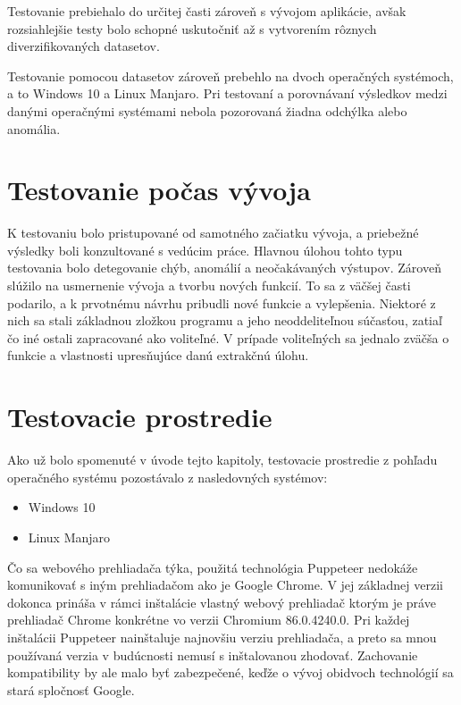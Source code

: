 Testovanie prebiehalo do určitej časti zároveň s vývojom aplikácie, avšak rozsiahlejšie testy bolo schopné uskutočniť až s vytvorením rôznych diverzifikovaných datasetov.

Testovanie pomocou datasetov zároveň prebehlo na dvoch operačných systémoch, a to Windows 10 a Linux Manjaro. Pri testovaní a porovnávaní výsledkov medzi danými operačnými systémami nebola pozorovaná žiadna odchýlka alebo anomália. 

\section{Testovanie počas vývoja}

K testovaniu bolo pristupované od samotného začiatku vývoja, a priebežné výsledky boli konzultované s vedúcim práce. Hlavnou úlohou tohto typu testovania bolo detegovanie chýb, anomálií a neočakávaných výstupov. Zároveň slúžilo na usmernenie vývoja a tvorbu nových funkcií. To sa z väčšej časti podarilo, a k prvotnému návrhu pribudli nové funkcie a vylepšenia. Niektoré z nich sa stali základnou zložkou programu a jeho neoddeliteľnou súčasťou, zatiaľ čo iné ostali zapracované ako voliteľné. V prípade voliteľných sa jednalo zväčša o funkcie a vlastnosti upresňujúce danú extrakčnú úlohu.

\section{Testovacie prostredie}

Ako už bolo spomenuté v úvode tejto kapitoly, testovacie prostredie z pohľadu operačného systému pozostávalo z nasledovných systémov:

\begin{itemize}
    \item Windows 10
    \item Linux Manjaro
\end{itemize}

\newpage

Čo sa webového prehliadača týka, použitá technológia Puppeteer nedokáže komunikovať s iným prehliadačom ako je Google Chrome. V jej základnej verzii dokonca prináša v rámci inštalácie vlastný webový prehliadač ktorým je práve prehliadač Chrome konkrétne vo verzii Chromium 86.0.4240.0. Pri každej inštalácii Puppeteer nainštaluje najnovšiu verziu prehliadača, a preto sa mnou používaná verzia v budúcnosti nemusí s inštalovanou zhodovať. Zachovanie kompatibility by ale malo byť zabezpečené, keďže o vývoj obidvoch technológií sa stará spločnosť Google.

